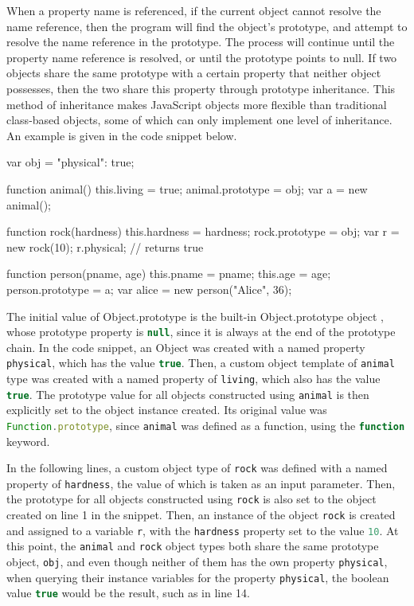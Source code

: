 \documentclass[a4paper,11pt,twoside]{report}
\def\jsinline{\lstinline[language=JavaScript, basicstyle=\small]}%\end{lstlisting}
\begin{document}
When a property name is referenced, if the current object cannot resolve the name reference, then the program will find the object's prototype, and attempt to resolve the name reference in the prototype. The process will continue until the property name reference is resolved, or until the prototype points to null. If two objects share the same prototype with a certain property that neither object possesses, then the two share this property through prototype inheritance. This method of inheritance makes JavaScript objects more flexible than traditional class-based objects, some of which can only implement one level of inheritance. An example is given in the code snippet below.

\quad
\begin{minipage}{0.395\textwidth}
\qquad
\begin{lstjs}
var obj = {"physical": true};

function animal() {
	this.living = true;
}
animal.prototype = obj;
var a = new animal();

function rock(hardness) {
	this.hardness = hardness;
}
rock.prototype = obj;
var r = new rock(10);
r.physical; // returns true

function person(pname, age) {
	this.pname = pname;
	this.age = age;
}
person.prototype = a;
var alice = new person("Alice", 36);

\end{lstjs}
\end{minipage}
\begin{minipage}{0.54\textwidth}
The initial value of Object.prototype is the built-in Object.prototype object \cite{EcmaScript}, whose prototype property is \jsinline|null|, since it is always at the end of the prototype chain. In the code snippet, an Object was created with a named property \jsinline|physical|, which has the value \jsinline|true|. Then, a custom object template of \jsinline|animal| type was created with a named property of \jsinline|living|, which also has the value \jsinline|true|. The prototype value for all objects constructed using \jsinline|animal| is then explicitly set to the object instance created. Its original value was \jsinline|Function.prototype|, since \jsinline|animal| was defined as a function, using the \jsinline|function| keyword. 
\end{minipage}

In the following lines, a custom object type of \jsinline|rock| was defined with a named property of \jsinline|hardness|, the value of which is taken as an input parameter. Then, the prototype for all objects constructed using \jsinline|rock| is also set to the object created on line 1 in the snippet. Then, an instance of the object \jsinline|rock| is created and assigned to a variable \jsinline|r|, with the \jsinline|hardness| property set to the value \jsinline|10|. At this point, the \jsinline|animal| and \jsinline|rock| object types both share the same prototype object, \jsinline|obj|, and even though neither of them has the own property \jsinline|physical|, when querying their instance variables for the property \jsinline|physical|, the boolean value \jsinline|true| would be the result, such as in line 14. 
\end{document}
